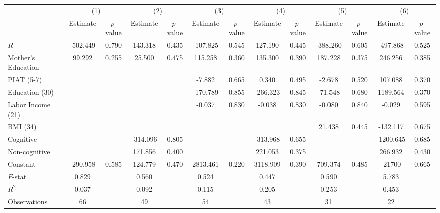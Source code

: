 \begin{table}[htbp]
\begin{tabular}{lcccccccccccc} \toprule
 & \multicolumn{2}{c}{(1)}  &  \multicolumn{2}{c}{(2)}  &  \multicolumn{2}{c}{(3)}  &  \multicolumn{2}{c}{(4)}  & \multicolumn{2}{c}{(5)} & \multicolumn{2}{c}{(6)} \\  
 & Estimate & $p$-value & Estimate & $p$-value & Estimate & $p$-value & Estimate & $p$-value & Estimate & $p$-value & Estimate & $p$-value \\ \midrule
$R$ &  -502.449 &     0.790 &   143.318 &     0.435 &  -107.825 &     0.545 &   127.190 &     0.445 &  -388.260 &     0.605 &  -497.868 &     0.525 \\  
Mother's Education &    99.292 &     0.255 &    25.500 &     0.475 &   115.258 &     0.360 &   135.300 &     0.390 &   187.228 &     0.375 &   246.256 &     0.385 \\  
PIAT (5-7) &         &         &         &         &    -7.882 &     0.665 &     0.340 &     0.495 &    -2.678 &     0.520 &   107.088 &     0.370 \\  
Education (30) &         &         &         &         &  -170.789 &     0.855 &  -266.323 &     0.845 &   -71.548 &     0.680 &  1189.564 &     0.370 \\  
Labor Income (21) &         &         &         &         &    -0.037 &     0.830 &    -0.038 &     0.830 &    -0.080 &     0.840 &    -0.029 &     0.595 \\  
BMI (34) &         &         &         &         &         &         &         &         &    21.438 &     0.445 &  -132.117 &     0.675 \\  
Cognitive &         &         &  -314.096 &     0.805 &         &         &  -313.968 &     0.655 &         &         & -1200.645 &     0.685 \\  
Non-cognitive &         &         &   171.856 &     0.400 &         &         &   221.053 &     0.375 &         &         &   266.932 &     0.430 \\  
Constant &  -290.958 &     0.585 &   124.779 &     0.470 &  2813.461 &     0.220 &  3118.909 &     0.390 &   709.374 &     0.485 & -21700 &     0.665 \\  \midrule
$F$-stat &     0.829 &         &     0.560 &         &     0.524 &         &     0.447 &         &     0.590 &         &     5.783 &         \\  
$R^2$ &     0.037 &         &     0.092 &         &     0.115 &         &     0.205 &         &     0.253 &         &     0.453 &         \\  
Observations &    66 &         &    49 &         &    54 &         &    43 &         &    31 &         &    22 &         \\  
\bottomrule \end{tabular}
\end{table}
